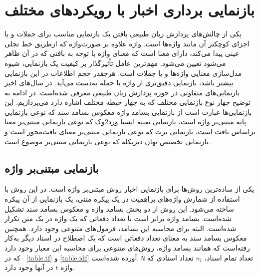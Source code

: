 \section{بازنمایی برداری اخبار با رویکردهای مختلف}
یکی از چالش‌های پردازش زبان طبیعی یافتن یک بازنمایی مناسب برای جملات و یا اجزای کوچکتر آن مانند واژه‌ها است. واژه علاوه بر صورت‌واژه که ازطریق خط تجلی عینی پیدا می‌کند، دارای معنا است که معنای واژه با توجه به بافتی که در آن ظاهر می‌شود تعیین می‌شود. مهم‌ترین عامل تأثیرگذار بر کیفیت یک بازنمایی، شیوه مدل‌سازی معنایی واژه‌ها و یا جملات است. هرچقدر حجم اطلاعات در این بازنمایی بیشتر باشد، بازنمایی دقیق‌تری از واژه یا جمله به‌دست می‌آید. در سال‌های اخیر بازنمایی‌های متفاوتی در حوزه پردازش زبان طبیعی معرفی شده‌است. در ادامه به توضیح چهار نوع بازنمایی مختلف که به چهار حیطه مختلف اشاره دارد می‌پردازیم. این بازنمایی‌ها عبارت است از بازنمایی بسامد واژه-معکوس بسامد سند که نوعی بازنمایی پایه مبتنی‌بر واژه است، بازنمایی تعبیه ایستا ورد2وک که نوعی بازنمایی مبتنی‌بر معنا براساس بافت است، بازنمایی برت که نوعی بازنمایی مبتنی‌بر معنای بافت‌محور است و بازنمایی تخصیص نهان دیریکله که نوعی بازنمایی مبتنی‌بر موضوع است.

\subsection{بازنمایی مبتنی‌بر واژه}
یکی از ساده‌ترین روش‌ها برای بازنمایی اخبار روش مبتنی‌بر واژه است. در این روش با استفاده از شمارش واژه‌های پراهمیت در یک پیکره متنی، یک بازنمایی از آن‌ پیکره ساخته می‌شود. این روش از دو بخش بسامد واژه و معکوس بسامد سند تشکیل شده‌است. بسامد واژه برابر است با تعداد دفعاتی که یک واژه در یک متن تکرار شده‌است. البته برای محاسبه این بسامد، فرمول‌های متنوعی وجود دارد. همچنین معکوس بسامد سند به معنای تعداد دفعاتی است که یک اصطلاح در اسناد دیگر به‌کار رفته‌است که همانند بسامد واژه، روش‌های متنوعی برای محاسبه این معیار وجود دارد که در \tablename~\ref{table.tf} و \ref{table.idf} آورده شده‌است. \verb|N| تعداد تمام اسناد، $n_t$ تعداد اسنادی که واژه $t$ در آنها وجود دارد.


